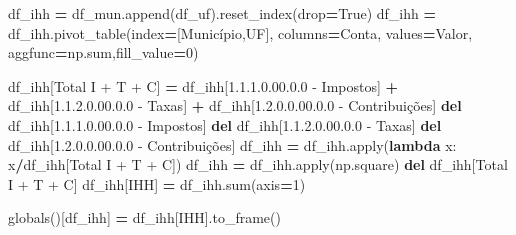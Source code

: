 \documentclass[
  12,
  dvipsnames]{article}
\newenvironment{Shaded}{\begin{snugshade}}{\end{snugshade}}
\newcommand{\BuiltInTok}[1]{#1}
\newcommand{\DecValTok}[1]{\textcolor[rgb]{0.00,0.00,0.81}{#1}}
\newcommand{\KeywordTok}[1]{\textcolor[rgb]{0.13,0.29,0.53}{\textbf{#1}}}
\newcommand{\NormalTok}[1]{#1}
\newcommand{\OperatorTok}[1]{\textcolor[rgb]{0.81,0.36,0.00}{\textbf{#1}}}
\newcommand{\StringTok}[1]{\textcolor[rgb]{0.31,0.60,0.02}{#1}}
\newcommand{\VariableTok}[1]{\textcolor[rgb]{0.00,0.00,0.00}{#1}}
\begin{document}
\begin{Shaded}
\begin{Highlighting}[]
\NormalTok{    df\_ihh }\OperatorTok{=}\NormalTok{ df\_mun.append(df\_uf).reset\_index(drop}\OperatorTok{=}\VariableTok{True}\NormalTok{)}
\NormalTok{    df\_ihh }\OperatorTok{=}\NormalTok{ df\_ihh.pivot\_table(index}\OperatorTok{=}\NormalTok{[}\StringTok{\textquotesingle{}Município\textquotesingle{}}\NormalTok{,}\StringTok{\textquotesingle{}UF\textquotesingle{}}\NormalTok{], columns}\OperatorTok{=}\StringTok{\textquotesingle{}Conta\textquotesingle{}}\NormalTok{, values}\OperatorTok{=}\StringTok{\textquotesingle{}Valor\textquotesingle{}}\NormalTok{,}
\NormalTok{                                aggfunc}\OperatorTok{=}\NormalTok{np.}\BuiltInTok{sum}\NormalTok{,fill\_value}\OperatorTok{=}\DecValTok{0}\NormalTok{)}
    
\NormalTok{    df\_ihh[}\StringTok{\textquotesingle{}Total I + T + C\textquotesingle{}}\NormalTok{] }\OperatorTok{=}\NormalTok{ df\_ihh[}\StringTok{\textquotesingle{}1.1.1.0.00.0.0 {-} Impostos\textquotesingle{}}\NormalTok{] }\OperatorTok{+}\NormalTok{ df\_ihh[}\StringTok{\textquotesingle{}1.1.2.0.00.0.0 {-} Taxas\textquotesingle{}}\NormalTok{] }\OperatorTok{+}\NormalTok{ df\_ihh[}\StringTok{\textquotesingle{}1.2.0.0.00.0.0 {-} Contribuições\textquotesingle{}}\NormalTok{]}
    \KeywordTok{del}\NormalTok{ df\_ihh[}\StringTok{\textquotesingle{}1.1.1.0.00.0.0 {-} Impostos\textquotesingle{}}\NormalTok{]}
    \KeywordTok{del}\NormalTok{ df\_ihh[}\StringTok{\textquotesingle{}1.1.2.0.00.0.0 {-} Taxas\textquotesingle{}}\NormalTok{]}
    \KeywordTok{del}\NormalTok{ df\_ihh[}\StringTok{\textquotesingle{}1.2.0.0.00.0.0 {-} Contribuições\textquotesingle{}}\NormalTok{]}
\NormalTok{    df\_ihh }\OperatorTok{=}\NormalTok{ df\_ihh.}\BuiltInTok{apply}\NormalTok{(}\KeywordTok{lambda}\NormalTok{ x: x}\OperatorTok{/}\NormalTok{df\_ihh[}\StringTok{\textquotesingle{}Total I + T + C\textquotesingle{}}\NormalTok{])}
\NormalTok{    df\_ihh }\OperatorTok{=}\NormalTok{ df\_ihh.}\BuiltInTok{apply}\NormalTok{(np.square)}
    \KeywordTok{del}\NormalTok{ df\_ihh[}\StringTok{\textquotesingle{}Total I + T + C\textquotesingle{}}\NormalTok{]}
\NormalTok{    df\_ihh[}\StringTok{\textquotesingle{}IHH\textquotesingle{}}\NormalTok{] }\OperatorTok{=}\NormalTok{ df\_ihh.}\BuiltInTok{sum}\NormalTok{(axis}\OperatorTok{=}\DecValTok{1}\NormalTok{)}
      
    \BuiltInTok{globals}\NormalTok{()[}\StringTok{\textquotesingle{}df\_ihh\textquotesingle{}}\NormalTok{] }\OperatorTok{=}\NormalTok{ df\_ihh[}\StringTok{\textquotesingle{}IHH\textquotesingle{}}\NormalTok{].to\_frame()}
    

\end{Highlighting}
\end{Shaded}
\end{document}
